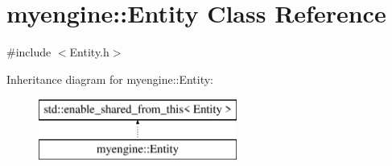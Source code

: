 \hypertarget{classmyengine_1_1_entity}{}\section{myengine\+:\+:Entity Class Reference}
\label{classmyengine_1_1_entity}


{\ttfamily \#include $<$Entity.\+h$>$}

Inheritance diagram for myengine\+:\+:Entity\+:\begin{figure}[H]
\begin{center}
\leavevmode
\includegraphics[height=2.000000cm]{classmyengine_1_1_entity}
\end{center}
\end{figure}
